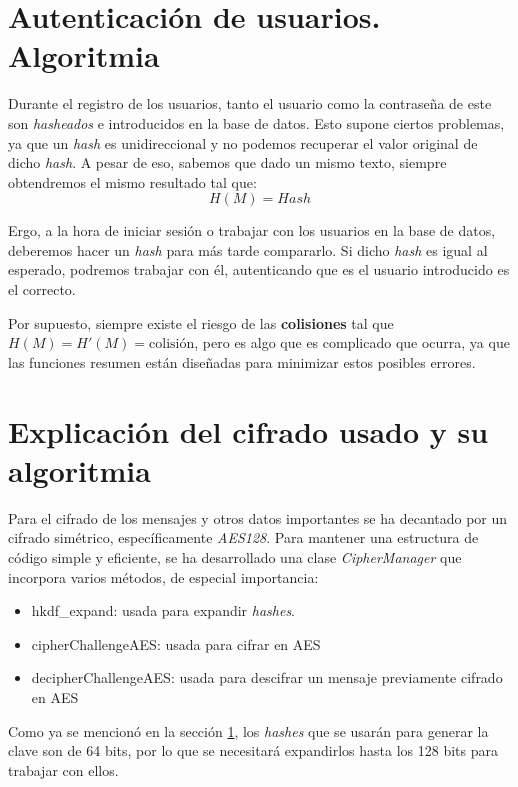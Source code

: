 \documentclass[a4paper,11pt]{article}
\begin{document}
\section{Autenticación de usuarios. Algoritmia}
\label{sec:autenticacionUsuarios}
Durante el registro de los usuarios, tanto el usuario como la contraseña de este son \textit{hasheados} e introducidos en la base de datos. Esto supone ciertos problemas, ya que un \textit{hash} es unidireccional y no podemos recuperar el valor original de dicho \textit{hash}. A pesar de eso, sabemos que dado un mismo texto, siempre obtendremos el mismo resultado tal que:
$$H(M) = Hash$$

Ergo, a la hora de iniciar sesión o trabajar con los usuarios en la base de datos, deberemos hacer un \textit{hash} para más tarde compararlo. Si dicho \textit{hash} es igual al esperado, podremos trabajar con él, autenticando que es el usuario introducido es el correcto.

Por supuesto, siempre existe el riesgo de las \textbf{colisiones} tal que $H(M) = H'(M) = \text{colisión}$, pero es algo que es complicado que ocurra, ya que las funciones resumen están diseñadas para minimizar estos posibles errores.

\section{Explicación del cifrado usado y su algoritmia}
Para el cifrado de los mensajes y otros datos importantes se ha decantado por un cifrado simétrico, específicamente \textit{AES128}. Para mantener una estructura de código simple y eficiente, se ha desarrollado una clase \textit{CipherManager} que incorpora varios métodos, de especial importancia:
\begin{itemize}
    \item hkdf\_expand: usada para expandir \textit{hashes}.
    \item cipherChallengeAES: usada para cifrar en AES
    \item decipherChallengeAES: usada para descifrar un mensaje previamente cifrado en AES
\end{itemize}

Como ya se mencionó en la sección \ref{sec:autenticacionUsuarios}, los \textit{hashes} que se usarán para generar la clave son de 64 bits, por lo que se necesitará expandirlos hasta los 128 bits para trabajar con ellos.
\end{document}
